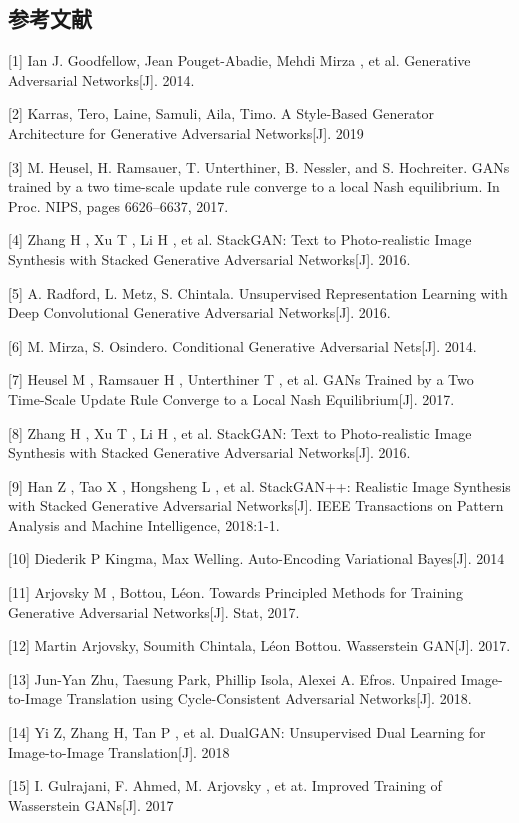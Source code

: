 \documentclass{article}
\begin{document}
\begin{CJK*}{UTF8}{gbsn}
\section*{参考文献}

\small

[1] Ian J. Goodfellow, Jean Pouget-Abadie, Mehdi Mirza , et al. Generative Adversarial Networks[J]. 2014.

[2] Karras, Tero, Laine, Samuli, Aila, Timo. A Style-Based Generator Architecture for Generative Adversarial Networks[J]. 2019

[3] M. Heusel, H. Ramsauer, T. Unterthiner, B. Nessler, and S. Hochreiter. GANs trained by a two time-scale update rule converge to a local Nash equilibrium. In Proc. NIPS, pages 6626–6637, 2017.

[4] Zhang H , Xu T , Li H , et al. StackGAN: Text to Photo-realistic Image Synthesis with Stacked Generative Adversarial Networks[J]. 2016.

[5] A. Radford, L. Metz, S. Chintala. Unsupervised Representation Learning with Deep Convolutional Generative Adversarial Networks[J]. 2016.

[6] M. Mirza, S. Osindero. Conditional Generative Adversarial Nets[J]. 2014.

[7] Heusel M , Ramsauer H , Unterthiner T , et al. GANs Trained by a Two Time-Scale Update Rule Converge to a Local Nash Equilibrium[J]. 2017.

[8] Zhang H , Xu T , Li H , et al. StackGAN: Text to Photo-realistic Image Synthesis with Stacked Generative Adversarial Networks[J]. 2016.

[9] Han Z , Tao X , Hongsheng L , et al. StackGAN++: Realistic Image Synthesis with Stacked Generative Adversarial Networks[J]. IEEE Transactions on Pattern Analysis and Machine Intelligence, 2018:1-1.

[10] Diederik P Kingma, Max Welling. Auto-Encoding Variational Bayes[J]. 2014

[11] Arjovsky M , Bottou, L\'{e}on. Towards Principled Methods for Training Generative Adversarial Networks[J]. Stat, 2017.

[12] Martin Arjovsky, Soumith Chintala, L\'{e}on Bottou. Wasserstein GAN[J]. 2017.

[13] Jun-Yan Zhu, Taesung Park, Phillip Isola, Alexei A. Efros. Unpaired Image-to-Image Translation using Cycle-Consistent Adversarial Networks[J]. 2018.

[14] Yi Z, Zhang H, Tan P , et al. DualGAN: Unsupervised Dual Learning for Image-to-Image Translation[J]. 2018

[15] I. Gulrajani, F. Ahmed, M. Arjovsky , et at. Improved Training of Wasserstein GANs[J]. 2017

\end{CJK*}
\end{document}
